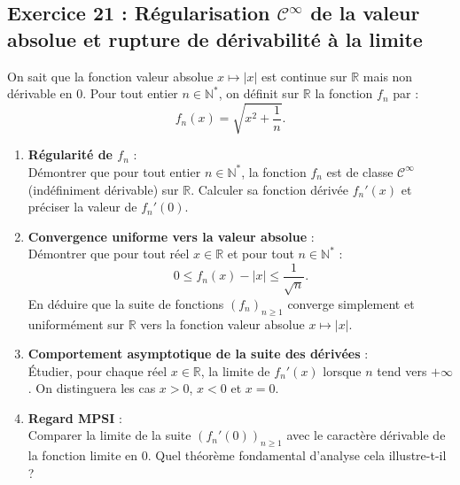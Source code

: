 \documentclass[11pt,a4paper]{article}
\newcommand{\N}{\mathbb{N}}
\newcommand{\R}{\mathbb{R}}
\begin{document}
\subsection*{Exercice 21 : Régularisation $\mathcal{C}^\infty$ de la valeur absolue et rupture de dérivabilité à la limite}

On sait que la fonction valeur absolue $x \mapsto |x|$ est continue sur $\R$ mais non dérivable en $0$.
Pour tout entier $n \in \N^*$, on définit sur $\R$ la fonction $f_n$ par :
\[
f_n(x) = \sqrt{x^2 + \frac{1}{n}}.
\]
\begin{enumerate}[label=\textbf{\arabic*.}]
    \item \textbf{Régularité de $f_n$} :\\
    Démontrer que pour tout entier $n \in \N^*$, la fonction $f_n$ est de classe $\mathcal{C}^\infty$ (indéfiniment dérivable) sur $\R$.
    Calculer sa fonction dérivée $f_n'(x)$ et préciser la valeur de $f_n'(0)$.
    \item \textbf{Convergence uniforme vers la valeur absolue} :\\
    Démontrer que pour tout réel $x \in \R$ et pour tout $n \in \N^*$ :
    \[
    0 \le f_n(x) - |x| \le \frac{1}{\sqrt{n}}.
    \]
    En déduire que la suite de fonctions $(f_n)_{n \ge 1}$ converge simplement et uniformément sur $\R$ vers la fonction valeur absolue $x \mapsto |x|$.
    \item \textbf{Comportement asymptotique de la suite des dérivées} :\\
    Étudier, pour chaque réel $x \in \R$, la limite de $f_n'(x)$ lorsque $n$ tend vers $+\infty$. On distinguera les cas $x > 0$, $x < 0$ et $x = 0$.
    \item \textbf{Regard MPSI} :\\
    Comparer la limite de la suite $(f_n'(0))_{n \ge 1}$ avec le caractère dérivable de la fonction limite en $0$. Quel théorème fondamental d'analyse cela illustre-t-il ?
\end{enumerate}
\end{document}
